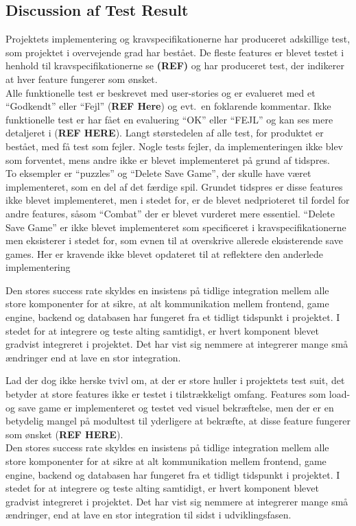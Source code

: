 \subsection{Discussion af Test Result}
Projektets implementering og kravspecifikationerne har produceret adskillige test, som 
projektet i overvejende grad har bestået. De fleste features er blevet
testet i henhold til kravspecifikationerne se \textbf{(REF)} og har produceret 
test, der indikerer at hver feature fungerer som ønsket. \\

Alle funktionelle test er beskrevet med user-stories og er evalueret med et ``Godkendt''
eller ``Fejl'' (\textbf{REF Here}) og evt.\ en foklarende kommentar. Ikke funktionelle 
test er har fået en evaluering ``OK'' eller ``FEJL'' og kan ses mere detaljeret i (\textbf{REF HERE}).
Langt størstedelen af alle test, for produktet er bestået, med få test som fejler. 
Nogle tests fejler, da implementeringen ikke blev som forventet, mens andre ikke er blevet 
implementeret på grund af tidspres. \\

To eksempler er ``puzzles'' og ``Delete Save Game'', der skulle have været implementeret, som en del af det færdige spil.
Grundet tidspres er disse features ikke blevet implementeret, men i stedet for, er de blevet
nedprioteret til fordel for andre features, såsom ``Combat'' der er blevet vurderet mere essentiel.
``Delete Save Game'' er ikke blevet implementeret som specificeret i kravspecifikationerne men
eksisterer i stedet for, som evnen til at overskrive allerede eksisterende save games. Her er 
kravende ikke blevet opdateret til at reflektere den anderlede implementering

Den stores success rate skyldes en insistens på tidlige integration mellem alle store komponenter for at sikre, at 
alt kommunikation mellem frontend, game engine, backend og databasen har fungeret fra et tidligt 
tidspunkt i projektet. I stedet for at integrere og teste alting samtidigt, er hvert komponent 
blevet gradvist integreret i projektet. Det har vist sig nemmere at integrerer mange små ændringer
end at lave en stor integration.

Lad der dog ikke herske tvivl om, at der er store huller i projektets test suit, det
betyder at store features ikke er testet i tilstrækkeligt omfang. Features som load- og save game er implementeret og testet ved visuel bekræftelse, men der er en betydelig mangel på modultest til yderligere at bekræfte, at disse feature fungerer som ønsket (\textbf{REF HERE}). \\

Den stores success rate skyldes en insistens på tidlige integration mellem alle store komponenter for at sikre at alt kommunikation mellem frontend, game engine, backend og databasen har fungeret fra et tidligt tidspunkt i projektet.
I stedet for at integrere og teste alting samtidigt, er hvert komponent blevet gradvist integreret i projektet. Det har vist sig nemmere at integrerer mange små ændringer, end at lave en stor integration til sidst i udviklingsfasen.


